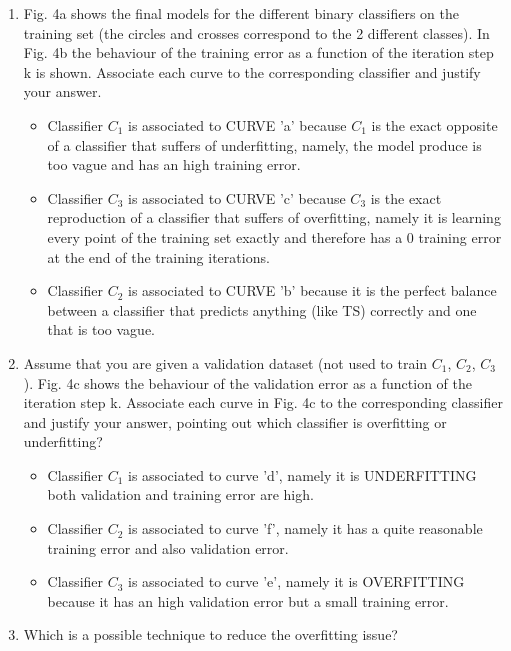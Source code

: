 \documentclass[a4paper,11pt,oneside]{book}
\begin{document}
    \begin{enumerate}
    \item Fig. 4a shows the final models for the different binary classifiers on the training set (the circles and crosses correspond to the 2 different classes). In Fig. 4b the behaviour of the training error as a function of the iteration step k is shown. Associate each curve to the corresponding classifier and justify your answer.
        \begin{solution}
            \begin{itemize}
            \item Classifier $C_1$ is associated to CURVE 'a' because $C_1$ is the exact opposite of a classifier that suffers of underfitting, namely, the model produce is too vague and has an high training error.
            
            \item Classifier $C_3$ is associated to CURVE 'c' because $C_3$ is the exact reproduction of a classifier that suffers of overfitting, namely it is learning every point of the training set exactly and therefore has a 0 training error at the end of the training iterations.
            
            \item Classifier $C_2$ is associated to CURVE 'b' because it is the perfect balance between a classifier that predicts anything (like TS) correctly and one that is too vague.
            \end{itemize}
        \end{solution}
    \item Assume that you are given a validation dataset (not used to train $C_1$, $C_2$, $C_3$). Fig. 4c shows the behaviour of the validation error as a function of the iteration step k. Associate each curve in Fig. 4c to the corresponding classifier and justify your answer, pointing out which classifier is overfitting or underfitting?
        \begin{solution}
            \begin{itemize}
            \item Classifier $C_1$ is associated to curve 'd', namely it is UNDERFITTING both validation and training error are high.
            
            \item Classifier $C_2$ is associated to curve 'f', namely it has a quite reasonable training error and also validation error.
            
            \item Classifier $C_3$ is associated to curve 'e', namely it is OVERFITTING because it has an high validation error but a small training error.
            \end{itemize}
        \end{solution}
    \clearpage
    \item Which is a possible technique to reduce the overfitting issue?


\end{enumerate}
\end{document}

